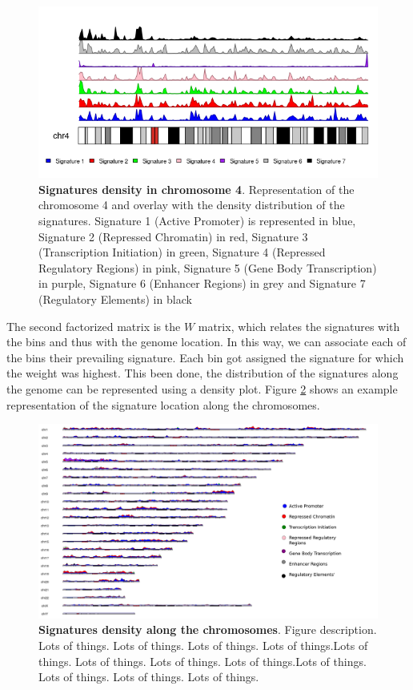 \begin{figure}[h!]
    \centering
    \includegraphics[width=\textwidth]{Figures/cover/chr4.png}
    \caption[Signatures density in chromosome 4]{\textbf{Signatures density in chromosome 4}. Representation of the chromosome 4 and overlay with the density distribution of the signatures. Signature 1 (Active Promoter) is represented in blue, Signature 2 (Repressed Chromatin) in red, Signature 3 (Transcription Initiation) in green, Signature 4 (Repressed Regulatory Regions) in pink, Signature 5 (Gene Body Transcription) in purple, Signature 6 (Enhancer Regions) in grey and Signature 7 (Regulatory Elements) in black}
    \label{fig:chr4}
\end{figure}

The second factorized matrix is the \(W\) matrix, which relates the signatures with the bins and thus with the genome location. In this way, we can associate each of the bins their prevailing signature. Each bin got assigned the signature for which the weight was highest. This been done, the distribution of the signatures along the genome can be represented using a density plot. Figure \ref{fig:W_density} shows an example representation of the signature location along the chromosomes.

\begin{figure}
    \includegraphics[width=\textwidth]{Figures/cover/signatures_density.png}
    \caption[Signatures density along the chromosomes]{\textbf{Signatures density along the chromosomes}. Figure description. Lots of things. Lots of things. Lots of things. Lots of things.Lots of things. Lots of things. Lots of things. Lots of things.Lots of things. Lots of things. Lots of things. Lots of things.}
    \label{fig:W_density}
\end{figure}

